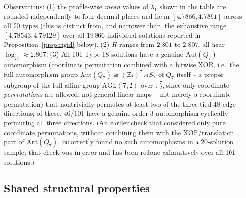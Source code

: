 \documentclass[12pt]{article}
\begin{document}
Observations: (1) the profile-wise \emph{mean} values of $\lambda_1$ shown
in the table are rounded independently to four decimal places and lie in
$[4.7866,4.7891]$ across all 20 types (this is distinct from, and narrower than,
the exhaustive range
$[4.78543,4.79129]$ over all $19\,866$ individual solutions reported
in Proposition~\ref{prop:rigid} below).
(2) $H$ ranges from $2.801$ to $2.807$, all near $\log_27\approx2.807$.
(3) All 101 Type-18 solutions have a genuine $\mathrm{Aut}(Q_7)$-automorphism
(coordinate permutation combined with a bitwise XOR, i.e.\ the full
automorphism group $\mathrm{Aut}(Q_7)\cong(\mathbb{Z}_2)^7\rtimes S_7$
of $Q_7$ itself -- a proper subgroup of the full affine group
$\mathrm{AGL}(7,2)$ over $\mathbb{F}_2^7$, since only coordinate
\emph{permutations} are allowed, not general linear maps -- not
merely a coordinate permutation) that nontrivially permutes at least
two of the three tied $48$-edge directions; of these, $46/101$ have a
genuine order-$3$ automorphism cyclically permuting all three
directions. (An earlier check that considered only pure coordinate
permutations, without combining them with the XOR/translation part of
$\mathrm{Aut}(Q_7)$, incorrectly found no such automorphisms in a
20-solution sample; that check was in error and has been redone
exhaustively over all 101 solutions.)

\subsection{Shared structural properties}
\end{document}
